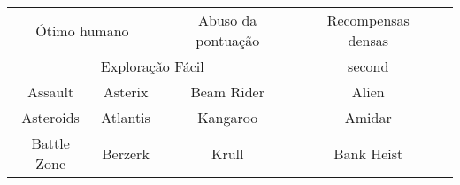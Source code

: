 \begin{tabular}{cc|c||c|c}
	\multicolumn{2}{c|}{Ótimo humano} & Abuso da pontuação & Recompensas densas \\
	\multicolumn{3}{c||}{Exploração Fácil}                 & second             \\
	Assault     & Asterix             & Beam Rider         & Alien              \\
	Asteroids   & Atlantis            & Kangaroo           & Amidar             \\
	Battle Zone & Berzerk             & Krull              & Bank Heist         \\
\end{tabular}
